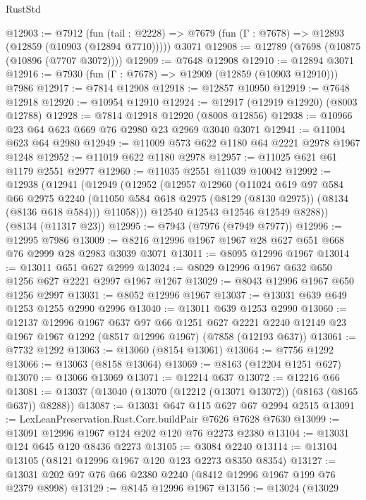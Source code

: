 \begin{lexlean}{RustStd}
\begin{coremodule}
{\begin{coremodule}
{{{{{{{{{{{{{{{{{{{{{{{{{{{{{{{{{{{{{{{{{{{{{{{{{{{{{@12903 := @7912
    (fun (tail : @2228) => @7679 (fun (Γ : @7678) => @12893 (@12859 (@10903 (@12894 @7710)))))
    @3071
@12908 := @12789 (@7698 (@10875 (@10896 (@7707 @3072))))
@12909 := @7648 @12908
@12910 := @12894 @3071
@12916 := @7930 (fun (Γ : @7678) => @12909 (@12859 (@10903 @12910))) @7986
@12917 := @7814 @12908
@12918 := @12857 @10950
@12919 := @7648 @12918
@12920 := @10954 @12910
@12924 := @12917 (@12919 @12920) (@8003 @12788)
@12928 := @7814 @12918 @12920 (@8008 @12856)
@12938 := @10966 @23 @64 @623 @669 @76 @2980 @23 @2969 @3040 @3071
@12941 := @11004 @623 @64 @2980
@12949 := @11009 @573 @622 @1180 @64 @2221 @2978 @1967 @1248
@12952 := @11019 @622 @1180 @2978
@12957 := @11025 @621 @61 @1179 @2551 @2977
@12960 := @11035 @2551 @11039 @10042
@12992 := @12938
    (@12941
      (@12949
        (@12952
          (@12957
            @12960
            (@11024
              @619
              @97
              @584
              @66
              @2975
              @2240
              (@11050 @584 @618 @2975 (@8129 (@8130 @2975)) (@8134 (@8136 @618 @584)))
              @11058)))
        @12540
        @12543
        @12546
        @12549
        @8288))
    (@8134 (@11317 @23))
@12995 := @7943 (@7976 (@7949 @7977))
@12996 := @12995 @7986
@13009 := @8216 @12996 @1967 @1967 @28 @627 @651 @668 @76 @2999 @28 @2983 @3039 @3071
@13011 := @8095 @12996 @1967
@13014 := @13011 @651 @627 @2999
@13024 := @8029 @12996 @1967 @632 @650 @1256 @627 @2221 @2997 @1967 @1267
@13029 := @8043 @12996 @1967 @650 @1256 @2997
@13031 := @8052 @12996 @1967
@13037 := @13031 @639 @649 @1253 @1255 @2990 @2996
@13040 := @13011 @639 @1253 @2990
@13060 := @12137
    @12996
    @1967
    @637
    @97
    @66
    @1251
    @627
    @2221
    @2240
    @12149
    @23
    @1967
    @1967
    @1292
    (@8517 @12996 @1967)
    (@7858 (@12193 @637))
@13061 := @7732 @1292
@13063 := @13060 (@8154 @13061)
@13064 := @7756 @1292
@13066 := @13063 (@8158 @13064)
@13069 := @8163 (@12204 @1251 @627)
@13070 := @13066 @13069
@13071 := @12214 @637
@13072 := @12216 @66
@13081 := @13037 (@13040 (@13070 (@12212 (@13071 @13072)) (@8163 (@8165 @637)) @8288))
@13087 := @13031 @647 @115 @627 @67 @2994 @2515
@13091 := LexLeanPreservation.Rust.Corr.buildPair @7626 @7628 @7630
@13099 := @13091 @12996 @1967 @124 @202 @120 @76 @2273 @2380
@13104 := @13031 @124 @645 @120 @8436 @2273
@13105 := @3084 @2240
@13114 := @13104 @13105 (@8121 @12996 @1967 @120 @123 @2273 @8350 @8354)
@13127 := @13031 @202 @97 @76 @66 @2380 @2240 (@8412 @12996 @1967 @199 @76 @2379 @8998)
@13129 := @8145 @12996 @1967
@13156 := @13024
    (@13029
}}}}}}}}}}}}}}}}}}}}}}}}}}}}}}}}}}}}}}}}}}}}}}}}}}}}}
\end{coremodule}}
\end{coremodule}
\end{lexlean}
